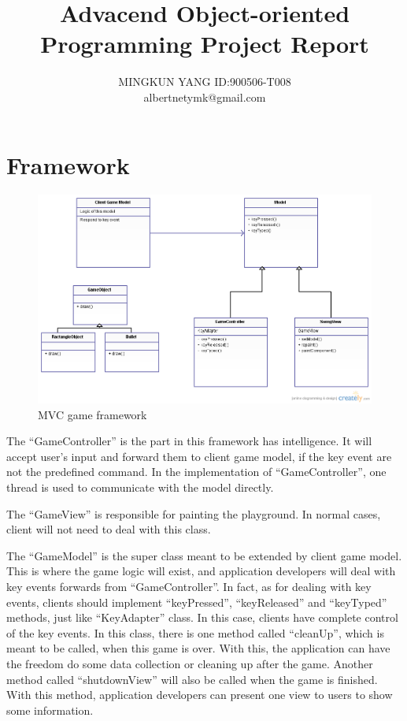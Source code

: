 \documentclass{report}
\begin{document}
\title{Advacend Object-oriented Programming Project Report}
\author{MINGKUN YANG ID:900506-T008\\
albertnetymk@gmail.com\\
}
\maketitle

\section{Framework}
\begin{figure}[t]
  \includegraphics[scale=0.5]{framework.png}
  \caption{MVC game framework}
\end{figure}
The ``GameController'' is the part in this framework has intelligence. It will accept user's input and forward them to client game model, if the key 
event are not the predefined command. In the implementation of ``GameController'', one thread is used to communicate with the model directly.

The ``GameView'' is responsible for painting the playground. In normal cases, client will not need to deal with this class.

The ``GameModel'' is the super class meant to be extended by client game model. This is where the game logic will exist, and application developers 
will deal with key events forwards from ``GameController''. In fact, as for dealing with key events, clients should implement ``keyPressed'', 
``keyReleased'' and ``keyTyped'' methods, just like ``KeyAdapter'' class. In this case, clients have complete control of the key events. In this 
class, there is one method called ``cleanUp'', which is meant to be called, when this game is over. With this, the application can have the freedom 
do some data collection or cleaning up after the game. Another method called ``shutdownView'' will also be called when the game is finished. With 
this method, application developers can present one view to users to show some information.
\end{document}
